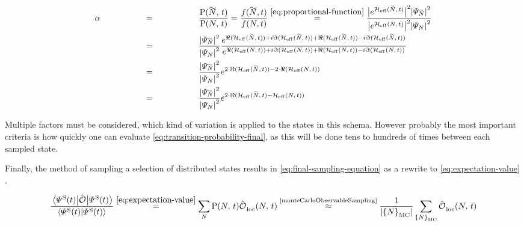 \begin{equation}
    \label{eq:transition-probability-final}
    \begin{split}
        \alpha &\stackrel{\phantom{\ref{eq:proportional-function}}}{=} \frac{\probabilityOf{\vphantom{N}\smash{\tilde{N}}}{t}}{\probabilityOf{N}{t}} =  \frac{f(\vphantom{N}\smash{\tilde{N}},t)}{f(N,t)}
        \stackrel{\ref{eq:proportional-function}}{=}
        \frac{
            \absSquare{e^{\HeffOft[\vphantom{N}\smash{\tilde{N}}]}} \absSquare{\psiN[\vphantom{N}\smash{\tilde{N}}]}
        }{
            \absSquare{e^{\HeffOft}} \absSquare{\psiN}
        }\\
        &\stackrel{\phantom{\ref{eq:proportional-function}}}{=}
        \frac{\absSquare{\psiN[\vphantom{N}\smash{\tilde{N}}]}}{\absSquare{\psiN}}
        \frac{
            e^{\real\left(\HeffOft[\vphantom{N}\smash{\tilde{N}}]\right) + i\imaginary\left(\HeffOft[\vphantom{N}\smash{\tilde{N}}]\right) +\real\left(\HeffOft[\vphantom{N}\smash{\tilde{N}}]\right)-i \imaginary\left(\HeffOft[\vphantom{N}\smash{\tilde{N}}]\right)}
        }{
            e^{\real\left(\HeffOft\right) + i\imaginary\left(\HeffOft\right) +\real\left(\HeffOft\right)-i \imaginary\left(\HeffOft\right)}
        }\\
        &\stackrel{\phantom{\ref{eq:proportional-function}}}{=}
        \frac{\absSquare{\psiN[\vphantom{N}\smash{\tilde{N}}]}}{\absSquare{\psiN}}
        e^{2\cdot \real\left(\HeffOft[\vphantom{N}\smash{\tilde{N}}]\right) - 2\cdot \real\left(\HeffOft\right)}\\
        &\stackrel{\phantom{\ref{eq:proportional-function}}}{=}
        \frac{\absSquare{\psiN[\vphantom{N}\smash{\tilde{N}}]}}{\absSquare{\psiN}}
        e^{2\cdot \real\left(\HeffOft[\vphantom{N}\smash{\tilde{N}}] - \HeffOft\right)}
    \end{split}
\end{equation}

Multiple factors must be considered, which kind of variation is applied to the states in this schema. 
However probably the most important criteria is how quickly one can evaluate \autoref{eq:transition-probability-final}, as this will be done tens to hundreds of times between each sampled state.

Finally, the method of sampling a selection of distributed states results in \autoref{eq:final-sampling-equation} as a rewrite to \autoref{eq:expectation-value} \cite{monteCarloObservableSampling}.

\begin{equation}
    \label{eq:final-sampling-equation}
    \frac{\bracketHelper{\psiOfT[\schroedingerPicture]}{\ObservableOp}{\psiOfT[\schroedingerPicture]}}{\braketHelper{\psiOfT[\schroedingerPicture]}{\psiOfT[\schroedingerPicture]}} \stackrel{\ref{eq:expectation-value}}{=} 
    \lsum[N]
    \probabilityOf{N}{t}
    \localObservable{N}{t} 
    \stackrel{\text{\cite{monteCarloObservableSampling}}}{\approx} \frac{1}{\left|\left\{N\right\}_\text{MC}\right|} \lsum[\left\{N\right\}_\text{MC}]\localObservable{N}{t}
\end{equation}